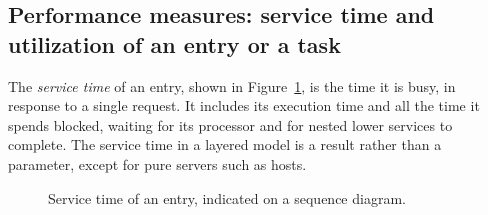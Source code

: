 \documentclass[11pt]{article}
\begin{document}
\subsection{Performance measures: service time and utilization of an entry or a task}

The \emph{service time} of an entry, shown in Figure~\ref{fig:service-time}, is the time it is busy, in response to a single request. It includes
its execution time and all the time it spends blocked, waiting for its processor and for nested lower
services to complete. The service time in a layered model is a result rather than a parameter, except
for pure servers such as hosts.

\begin{figure}
  \centering
  \qquad
  \caption{Service time of an entry, indicated on a sequence diagram.}
  \label{fig:service-time}
\end{figure}
\end{document}
